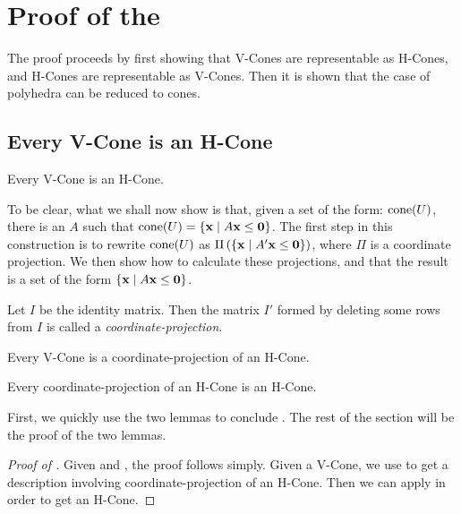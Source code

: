 \chapter{Proof of the \MWT}

The proof proceeds by first showing that V-Cones are representable as H-Cones, and H-Cones are representable as V-Cones.  Then it is shown that the case of polyhedra can be reduced to cones.


\section{Every V-Cone is an H-Cone}

\begin{Thm} \label{MWTFCvtoh}
  Every V-Cone is an H-Cone.
\end{Thm}

To be clear, what we shall now show is that, given a set of the form: $\operatorname{cone}(U)$, there is an $A$ such that $\operatorname{cone}(U) = \left\{\mathbf{x}\;|\; A\mathbf{x}\leq\mathbf{0}\right\}$.  The first step in this construction is to rewrite $\operatorname{cone}(U)$ as $\Pi\left(\left\{\mathbf{x}\;|\; A'\mathbf{x}\leq\mathbf{0}\right\}\right)$, where $\Pi$ is a coordinate projection.  We then show how to calculate these projections, and that the result is a set of the form $\left\{\mathbf{x}\;|\; A\mathbf{x}\leq\mathbf{0}\right\}$.

\begin{Def}
	Let $I$ be the identity matrix.  Then the matrix $I'$ formed by deleting some rows from $I$ is called a \textit{coordinate-projection}.
\end{Def}

\begin{Lemma}\label{vconelift}
	 Every V-Cone is a coordinate-projection of an H-Cone.
\end{Lemma}

\begin{Lemma}\label{hconeproject}
	 Every coordinate-projection of an H-Cone is an H-Cone.
\end{Lemma}

First, we quickly use the two lemmas to conclude .  The rest of the section will be the proof of the two lemmas.

\begin{proof}[Proof of ]
	Given  and , the proof follows simply.  Given a V-Cone, we use  to get a description involving coordinate-projection of an H-Cone.  Then we can apply  in order to get an H-Cone.
\end{proof}

